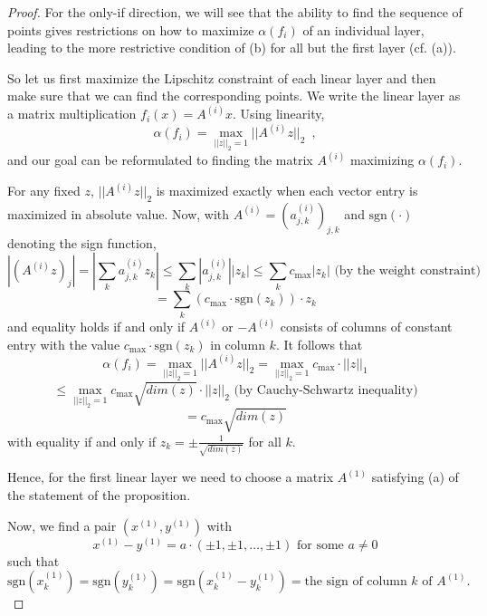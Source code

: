 \documentclass{article} %
\newcommand{\norm}[1]{||{#1}||_2}
\newcommand{\sgn}[1]{\text{sgn}({#1})}
\begin{document}
\begin{proof}
For the only-if direction, we will see that the ability to find the sequence of points gives restrictions on how to maximize $\alpha(f_i)$ of an individual layer, leading to the more restrictive condition of (b) for all but the first layer (cf. (a)). 

So let us first maximize the Lipschitz constraint of each linear layer and then make sure that we can find the corresponding points.
%
We write the linear layer as a matrix multiplication $f_i(x)=A^{(i)}x$. Using linearity, 
$$\alpha(f_i)=\max_{\norm{z}=1} \norm {A^{(i)} z} \enspace,
$$ and our goal can be reformulated to finding the matrix $A^{(i)}$ maximizing $\alpha(f_i)$. 

For any fixed $z$, $\norm {A^{(i)} z}$ is maximized exactly when each vector entry is maximized in absolute value. Now, with $A^{(i)}=(a^{(i)}_{j,k})_{j,k}$ and $\sgn{\cdot}$ denoting the sign function,
$$|(A^{(i)}z)_j|=\left |\sum_k a^{(i)}_{j,k} z_k \right | \leq \sum_k |a^{(i)}_{j,k}| |z_k| \leq \sum_k c_{\text{max}} |z_k| \text{ (by the weight constraint)}$$
$$ = \sum_k  (c_{\text{max}} \cdot \sgn{z_k}) \cdot z_k $$
and equality holds if and only if $A^{(i)}$ or $-A^{(i)}$ consists of columns of constant entry with the value $c_{\text{max}}\cdot\sgn{z_k}$ in column $k$. 
It follows that
$$\alpha(f_i)=\max_{\norm{z}=1} \norm {A^{(i)} z} =\max_{\norm{z}=1} c_{\text{max}}\cdot ||z||_1 $$
$$\leq  \max_{\norm{z}=1} c_{\text{max}}  \sqrt{dim(z)}\cdot \norm{z}\text{ (by Cauchy-Schwartz inequality)}$$
$$=c_{\text{max}}  \sqrt{dim(z)}$$
with equality if and only if $z_k=\pm \frac{1}{\sqrt{dim(z)}}$ for all $k$.

Hence, for the first linear layer we need to choose a matrix $A^{(1)}$ satisfying (a) of the statement of the proposition.

Now, we find a pair $(x^{(1)},y^{(1)})$ with $$x^{(1)}-y^{(1)}=a \cdot (\pm 1, \pm 1,\ldots ,\pm 1)\text{ for some }a\neq 0$$ such that 
$$\sgn{x^{(1)}_k}=\sgn{y^{(1)}_k}=\sgn{x^{(1)}_k-y^{(1)}_k }=\text{the sign of column $k$ of $A^{(1)}$.}\enspace$$


\end{proof}
\end{document}
